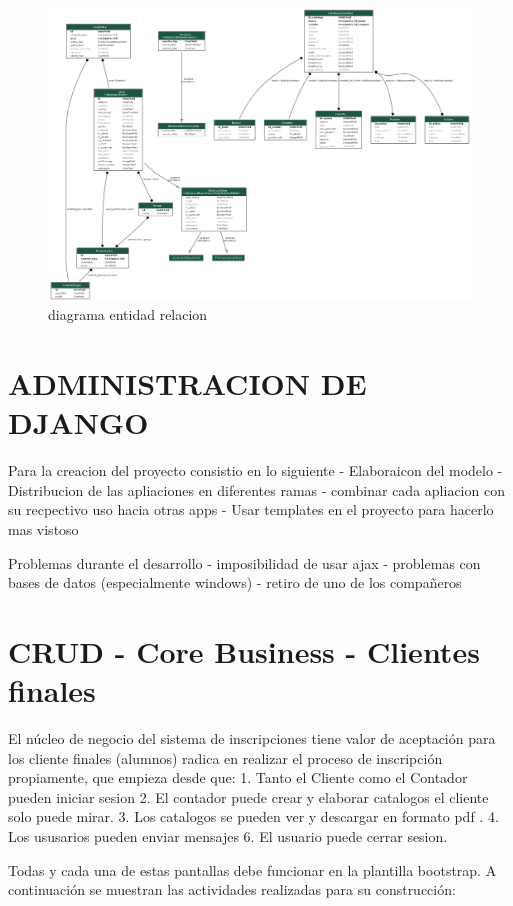 \documentclass{article}
\begin{document}
\begin{figure}[h]
    \centering
    \includegraphics[scale=0.2]{img/myapp_models.png}
    \caption{diagrama entidad relacion}
    \label{fig:mesh1}
\end{figure}

\section{ADMINISTRACION DE DJANGO}
Para la creacion del proyecto consistio en lo siguiente
- Elaboraicon del modelo
- Distribucion de las apliaciones en diferentes ramas
- combinar cada apliacion con su recpectivo uso hacia otras apps
- Usar templates en el proyecto para hacerlo mas vistoso

Problemas durante el desarrollo
- imposibilidad de usar ajax
- problemas con bases de datos (especialmente windows)
- retiro de uno de los compañeros 


\section{CRUD - Core Business - Clientes finales}
El núcleo de negocio del sistema de inscripciones tiene valor de aceptación para los cliente finales (alumnos) radica en realizar el proceso de inscripción propiamente, que empieza desde que:
1. Tanto el Cliente como el Contador pueden iniciar sesion
2. El contador puede crear y elaborar catalogos el cliente solo puede mirar.
3. Los catalogos se pueden ver y descargar en formato pdf .
4. Los ususarios pueden enviar mensajes
6. El usuario puede cerrar sesion.

Todas y cada una de estas pantallas debe funcionar en la plantilla bootstrap.
A continuación se muestran las actividades realizadas para su construcción:
\end{document}
